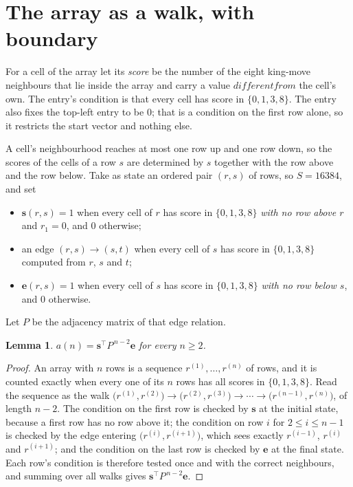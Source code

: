 \documentclass[11pt,a4paper]{article}
\theoremstyle{plain}
\newtheorem{lemma}[theorem]{Lemma}
\theoremstyle{definition}
\begin{document}
\section{The array as a walk, with boundary}

For a cell of the array let its \emph{score} be the number of the eight king-move neighbours that lie inside
the array and carry a value $different from$ the cell's own. The entry's condition is that every cell
has score in $\{0,1,3,8\}$. The entry also fixes the top-left entry to be $0$; that is a condition on the first row alone, so it restricts the start vector and nothing else.

A cell's neighbourhood reaches at most one row up and one row down, so the scores of the
cells of a row $s$ are determined by $s$ together with the row above and the row below.
Take as state an ordered pair $(r,s)$ of rows, so $S=16384$, and set
\begin{itemize}
\item $\mathbf{s}(r,s)=1$ when every cell of $r$ has score in $\{0,1,3,8\}$ \emph{with no row
above $r$} and $r_1=0$, and $0$ otherwise;
\item an edge $(r,s)\to(s,t)$ when every cell of $s$ has score in $\{0,1,3,8\}$ computed from
$r$, $s$ and $t$;
\item $\mathbf{e}(r,s)=1$ when every cell of $s$ has score in $\{0,1,3,8\}$ \emph{with no row
below $s$}, and $0$ otherwise.
\end{itemize}
Let $P$ be the adjacency matrix of that edge relation.

\begin{lemma}\label{lem:walk}
$a(n)=\mathbf{s}^{\!\top}P^{\,n-2}\mathbf{e}$ for every $n\ge2$.
\end{lemma}

\begin{proof}
An array with $n$ rows is a sequence $r^{(1)},\dots,r^{(n)}$ of rows, and it is counted
exactly when every one of its $n$ rows has all scores in $\{0,1,3,8\}$. Read the sequence as the
walk $\bigl(r^{(1)},r^{(2)}\bigr)\to\bigl(r^{(2)},r^{(3)}\bigr)\to\cdots\to
\bigl(r^{(n-1)},r^{(n)}\bigr)$, of length $n-2$. The condition on the first row is
checked by $\mathbf{s}$ at the initial state, because a first row has no row above it; the
condition on row $i$ for $2\le i\le n-1$ is checked by the edge entering
$\bigl(r^{(i)},r^{(i+1)}\bigr)$, which sees exactly $r^{(i-1)}$, $r^{(i)}$ and
$r^{(i+1)}$; and the condition on the last row is checked by $\mathbf{e}$ at the final
state. Each row's condition is therefore tested once and with the correct neighbours, and
summing over all walks gives $\mathbf{s}^{\!\top}P^{\,n-2}\mathbf{e}$.
\end{proof}
\end{document}
